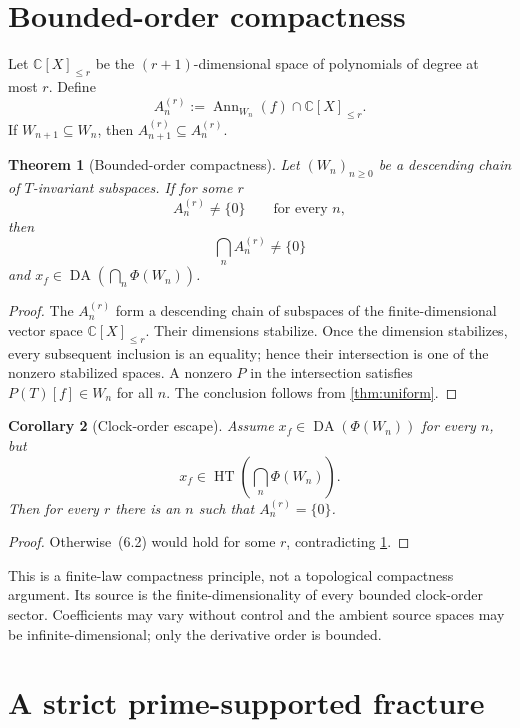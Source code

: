 \documentclass[11pt]{article}
\newtheorem{theorem}{Theorem}[section]
\newtheorem{corollary}[theorem]{Corollary}
\theoremstyle{definition}
\theoremstyle{remark}
\newcommand{\C}{\mathbb C}
\newcommand{\DA}{\operatorname{DA}}
\newcommand{\HT}{\operatorname{HT}}
\newcommand{\Ann}{\operatorname{Ann}}
\begin{document}
\section{Bounded-order compactness}\label{sec:compactness}

Let $\C[X]_{\leq r}$ be the $(r+1)$-dimensional space of polynomials of degree at most $r$.  Define
\[
  A_n^{(r)}:=\Ann_{W_n}(f)\cap\C[X]_{\leq r}.                   \tag{6.1}
\]
If $W_{n+1}\subseteq W_n$, then $A_{n+1}^{(r)}\subseteq A_n^{(r)}$.

\begin{theorem}[Bounded-order compactness]\label{thm:bounded}
Let $(W_n)_{n\geq0}$ be a descending chain of $T$-invariant subspaces.  If for some $r$
\[
  A_n^{(r)}\ne\{0\}\qquad\text{for every }n,                   \tag{6.2}
\]
then
\[
  \bigcap_n A_n^{(r)}\ne\{0\}                                 \tag{6.3}
\]
and $x_f\in\DA(\bigcap_n\Phi(W_n))$.
\end{theorem}

\begin{proof}
The $A_n^{(r)}$ form a descending chain of subspaces of the finite-dimensional vector space
$\C[X]_{\leq r}$.  Their dimensions stabilize.  Once the dimension stabilizes, every subsequent
inclusion is an equality; hence their intersection is one of the nonzero stabilized spaces.  A
nonzero $P$ in the intersection satisfies $P(T)[f]\in W_n$ for all $n$.  The conclusion follows
from \cref{thm:uniform}.
\end{proof}

\begin{corollary}[Clock-order escape]\label{cor:escape}
Assume $x_f\in\DA(\Phi(W_n))$ for every $n$, but
\[
  x_f\in\HT\!\left(\bigcap_n\Phi(W_n)\right).                  \tag{6.4}
\]
Then for every $r$ there is an $n$ such that $A_n^{(r)}=\{0\}$.
\end{corollary}

\begin{proof}
Otherwise~(6.2) would hold for some $r$, contradicting \cref{thm:bounded}.
\end{proof}

This is a finite-law compactness principle, not a topological compactness argument.  Its source is
the finite-dimensionality of every bounded clock-order sector.  Coefficients may vary without
control and the ambient source spaces may be infinite-dimensional; only the derivative order is
bounded.

\section{A strict prime-supported fracture}\label{sec:fracture}
\end{document}
